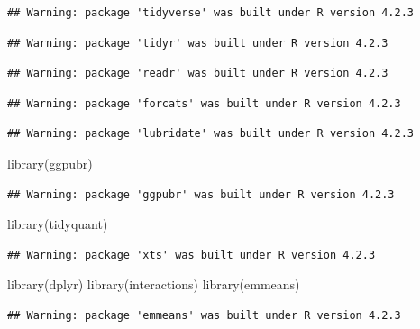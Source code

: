 \documentclass[
  bookmarksnumbered]{article}
\newenvironment{Shaded}{\begin{snugshade}}{\end{snugshade}}
\newcommand{\FunctionTok}[1]{\textcolor[rgb]{0.94,0.94,0.56}{#1}}
\newcommand{\NormalTok}[1]{\textcolor[rgb]{0.80,0.80,0.80}{#1}}
\begin{document}
\begin{verbatim}
## Warning: package 'tidyverse' was built under R version 4.2.3
\end{verbatim}

\begin{verbatim}
## Warning: package 'tidyr' was built under R version 4.2.3
\end{verbatim}

\begin{verbatim}
## Warning: package 'readr' was built under R version 4.2.3
\end{verbatim}

\begin{verbatim}
## Warning: package 'forcats' was built under R version 4.2.3
\end{verbatim}

\begin{verbatim}
## Warning: package 'lubridate' was built under R version 4.2.3
\end{verbatim}

\begin{Shaded}
\begin{Highlighting}[]
\FunctionTok{library}\NormalTok{(ggpubr)}
\end{Highlighting}
\end{Shaded}

\begin{verbatim}
## Warning: package 'ggpubr' was built under R version 4.2.3
\end{verbatim}

\begin{Shaded}
\begin{Highlighting}[]
\FunctionTok{library}\NormalTok{(tidyquant)}
\end{Highlighting}
\end{Shaded}

\begin{verbatim}
## Warning: package 'xts' was built under R version 4.2.3
\end{verbatim}

\begin{Shaded}
\begin{Highlighting}[]
\FunctionTok{library}\NormalTok{(dplyr)}
\FunctionTok{library}\NormalTok{(interactions)}
\FunctionTok{library}\NormalTok{(emmeans)}
\end{Highlighting}
\end{Shaded}

\begin{verbatim}
## Warning: package 'emmeans' was built under R version 4.2.3
\end{verbatim}
\end{document}
